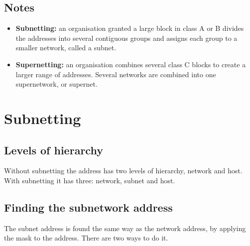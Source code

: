 \documentclass[11pt,a4paper]{article}
\begin{document}
\subsection*{Notes}

\begin{itemize}\itemsep2pt
  \item \textbf{Subnetting:} an organisation granted a large block in class A or B divides the
        addresses into several contiguous groups and assigns each group to a smaller network,
        called a subnet.
  \item \textbf{Supernetting:} an organisation combines several class C blocks to create a
        larger range of addresses. Several networks are combined into one supernetwork, or
        supernet.
\end{itemize}

\newpage
\section{Subnetting}



\subsection{Levels of hierarchy}

Without subnetting the address has two levels of hierarchy, network and host. With subnetting
it has three: network, subnet and host.

\subsection{Finding the subnetwork address}

The subnet address is found the same way as the network address, by applying the mask to the
address. There are two ways to do it.
\end{document}
